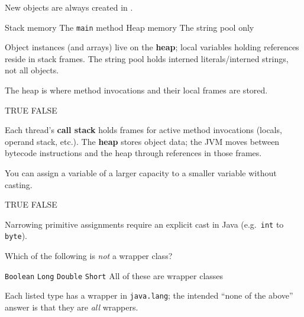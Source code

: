 
\question[4]
New objects are always created in \blank[8em].
\begin{choices}
  \choice Stack memory
  \choice The \texttt{main} method
  \CorrectChoice Heap memory
  \choice The string pool only
\end{choices}
\begin{solution}
  Object instances (and arrays) live on the \textbf{heap}; local variables holding references reside in stack frames. The string pool holds interned literals/interned strings, not all objects.
\end{solution}

\question[4]
The heap is where method invocations and their local frames are stored.
\begin{choices}
  \choice TRUE
  \CorrectChoice FALSE
\end{choices}
\begin{solution}
  Each thread's \textbf{call stack} holds frames for active method invocations (locals, operand stack, etc.). The \textbf{heap} stores object data; the JVM moves between bytecode instructions and the heap through references in those frames.
\end{solution}

\newpage


\question[4]
You can assign a variable of a larger capacity to a smaller variable without casting.
\begin{choices}
  \choice TRUE
  \CorrectChoice FALSE
\end{choices}
\begin{solution}
  Narrowing primitive assignments require an explicit cast in Java (e.g.\ \texttt{int} to \texttt{byte}).
\end{solution}

\question[4]
Which of the following is \emph{not} a wrapper class?
\begin{choices}
  \choice \texttt{Boolean}
  \choice \texttt{Long}
  \choice \texttt{Double}
  \choice \texttt{Short}
  \CorrectChoice All of these are wrapper classes
\end{choices}
\begin{solution}
  Each listed type has a wrapper in \texttt{java.lang}; the intended ``none of the above'' answer is that they are \emph{all} wrappers.
\end{solution}

